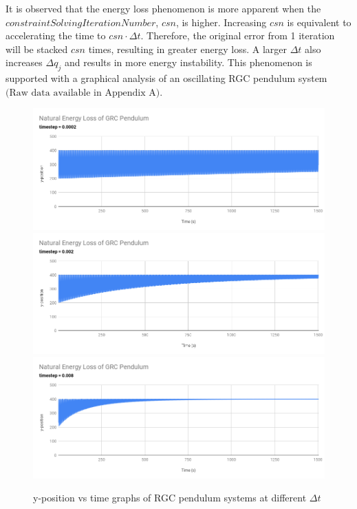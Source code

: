 \documentclass[12pt, letterpaper]{article}
\begin{document}
 It is observed that the energy loss phenomenon is more apparent when the\\
 $constraintSolvingIterationNumber$, $csn$, is higher. Increasing $csn$ is equivalent to accelerating the time to $csn \cdot \Delta t$. Therefore, the original error from 1 iteration will be stacked $csn$ times, resulting in greater energy loss. A larger $\Delta t$ also increases $\Delta q_j$ and results in more energy instability. This phenomenon is supported with a graphical analysis of an oscillating RGC pendulum system $\text{(Raw data available in Appendix A)}$.
\begin{figure}[H]
\centering
\includegraphics[width=15.5cm]{grc pendulum 0.0002.png}
\includegraphics[width=15.5cm]{grc pendulum 0.002.png}
\includegraphics[width=15.5cm]{grc pendulum 0.008.png}
\caption{y-position vs time graphs of RGC pendulum systems at different $\Delta t$}
\label{fig:figure}
\end{figure} 
\end{document}
